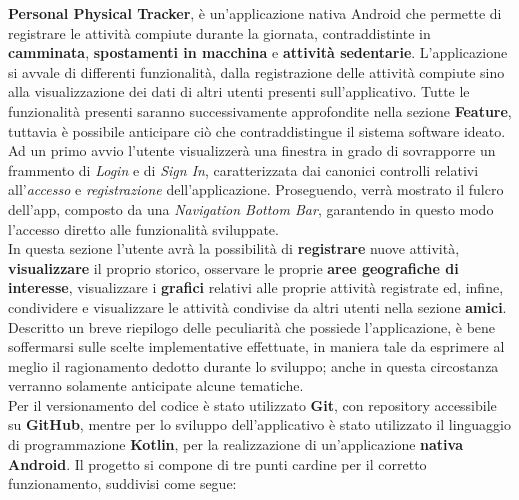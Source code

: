 \documentclass{article}
\begin{document}
\textbf{Personal Physical Tracker}, è un'applicazione nativa Android che permette di registrare le attività compiute durante la giornata, contraddistinte in \textbf{camminata}, \textbf{spostamenti in macchina} e \textbf{attività sedentarie}.
L'applicazione si avvale di differenti funzionalità, dalla registrazione delle attività compiute sino alla visualizzazione dei dati di altri utenti presenti sull'applicativo. Tutte le funzionalità presenti saranno successivamente approfondite nella sezione \textbf{Feature}, tuttavia è possibile anticipare ciò che contraddistingue il sistema software ideato. \vspace*{7pt}\\
Ad un primo avvio l'utente visualizzerà una finestra in grado di sovrapporre un frammento di \textit{Login} e di \textit{Sign In}, caratterizzata dai canonici controlli relativi all'\textit{accesso} e \textit{registrazione} dell'applicazione. Proseguendo, verrà mostrato il fulcro dell'app, composto da una \textit{Navigation Bottom Bar}, garantendo in questo modo l'accesso diretto alle funzionalità sviluppate. \\
In questa sezione l'utente avrà la possibilità di \textbf{registrare} nuove attività, \textbf{visualizzare} il proprio storico, osservare le proprie \textbf{aree geografiche di interesse}, visualizzare i \textbf{grafici} relativi alle proprie attività registrate ed, infine, condividere e visualizzare le attività condivise da altri utenti nella sezione \textbf{amici}. \vspace*{7pt}\\
Descritto un breve riepilogo delle peculiarità che possiede l'applicazione, è bene soffermarsi sulle scelte implementative effettuate, in maniera tale da esprimere al meglio il ragionamento dedotto durante lo sviluppo; anche in questa circostanza verranno solamente anticipate alcune tematiche. \vspace*{7pt}\\
Per il versionamento del codice è stato utilizzato \textbf{Git}, con repository accessibile su \textbf{GitHub}, mentre per lo sviluppo dell'applicativo è stato utilizzato il linguaggio di programmazione \textbf{Kotlin}, per la realizzazione di un'applicazione \textbf{nativa Android}. Il progetto si compone di tre punti cardine per il corretto funzionamento, suddivisi come segue:
\end{document}
